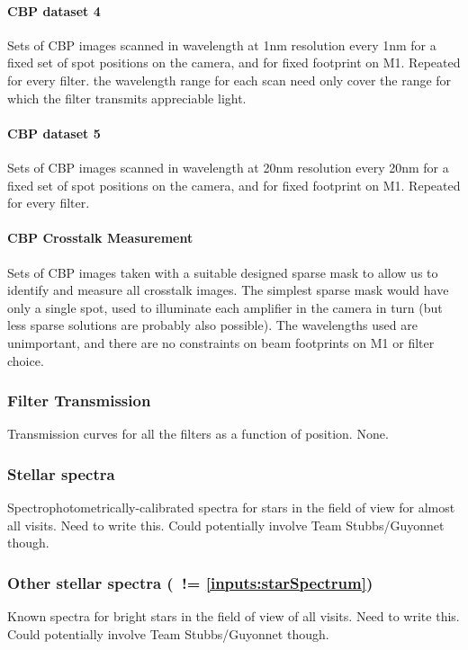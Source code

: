 \paragraph{CBP dataset 4}\label{sec:calibInputs:CBP:filter}
Sets of CBP images scanned in wavelength at 1nm resolution every 1nm for a fixed set of spot positions on the camera, and for fixed footprint on M1.  Repeated for every filter. \Nb the wavelength range for each scan need only cover the range for which the filter transmits appreciable light.


\paragraph{CBP dataset 5}\label{sec:calibInputs:CBP:leak}
Sets of CBP images scanned in wavelength at 20nm resolution every 20nm for a fixed set of spot positions on the camera, and for fixed footprint on M1. Repeated for every filter.


\paragraph {CBP Crosstalk Measurement}\label{sec:calibInputs:CBP:crosstalk}
Sets of CBP images taken with a suitable designed sparse mask to allow us to identify and measure all crosstalk images.  The simplest sparse mask would have only a single spot, used to illuminate each amplifier in the camera in turn (but less sparse solutions are probably also possible).  The wavelengths used are unimportant, and there are no constraints on beam footprints on M1 or filter choice.


\subsubsection{Filter Transmission}\label{sec:calibInputs:filterTransmission}
\cameraTeam
Transmission curves for all the filters as a function of position.
\alg None.


\subsubsection{Stellar spectra}\label{sec:calibInputs:starSpectrum} 
Spectrophotometrically-calibrated spectra for stars in the field of view for almost all visits.
\alg \xxx Need to write this. Could potentially involve Team Stubbs/Guyonnet though.


\subsubsection{Other stellar spectra (\nb~!= \ref{inputs:starSpectrum})}\label{sec:calibInputs:standardStarSpectrum}
Known spectra for bright stars in the field of view of all visits.
\alg \xxx Need to write this. Could potentially involve Team Stubbs/Guyonnet though.


